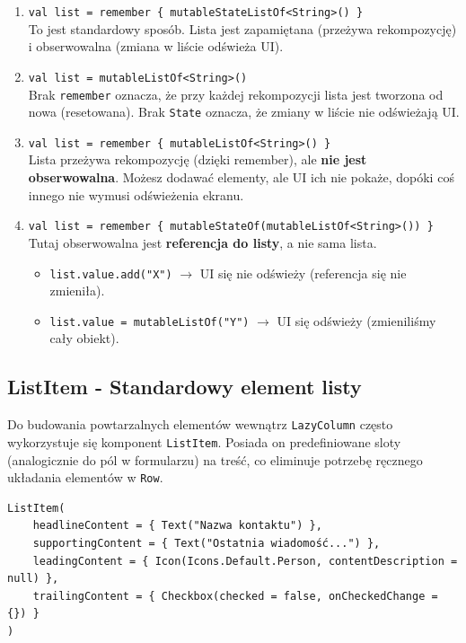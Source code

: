 \begin{enumerate}
    \item \texttt{val list = remember \{ mutableStateListOf<String>() \}} \\
    To jest standardowy sposób. Lista jest zapamiętana (przeżywa rekompozycję) i obserwowalna (zmiana w liście odświeża UI).

    \item \texttt{val list = mutableListOf<String>()} \\
    Brak \texttt{remember} oznacza, że przy każdej rekompozycji lista jest tworzona od nowa (resetowana). Brak \texttt{State} oznacza, że zmiany w liście nie odświeżają UI.

    \item \texttt{val list = remember \{ mutableListOf<String>() \}} \\
    Lista przeżywa rekompozycję (dzięki remember), ale \textbf{nie jest obserwowalna}. Możesz dodawać elementy, ale UI ich nie pokaże, dopóki coś innego nie wymusi odświeżenia ekranu.

    \item \texttt{val list = remember \{ mutableStateOf(mutableListOf<String>()) \}} \\
    Tutaj obserwowalna jest \textbf{referencja do listy}, a nie sama lista.
    \begin{itemize}
        \item \texttt{list.value.add("X")} $\rightarrow$ UI się nie odświeży (referencja się nie zmieniła).
        \item \texttt{list.value = mutableListOf("Y")} $\rightarrow$ UI się odświeży (zmieniliśmy cały obiekt).
    \end{itemize}
\end{enumerate}

\subsection{ListItem - Standardowy element listy}
Do budowania powtarzalnych elementów wewnątrz \texttt{LazyColumn} często wykorzystuje się komponent \texttt{ListItem}. Posiada on predefiniowane sloty (analogicznie do pól w formularzu) na treść, co eliminuje potrzebę ręcznego układania elementów w \texttt{Row}.

\begin{verbatim}
ListItem(
    headlineContent = { Text("Nazwa kontaktu") },
    supportingContent = { Text("Ostatnia wiadomość...") },
    leadingContent = { Icon(Icons.Default.Person, contentDescription = null) },
    trailingContent = { Checkbox(checked = false, onCheckedChange = {}) }
)
\end{verbatim}

